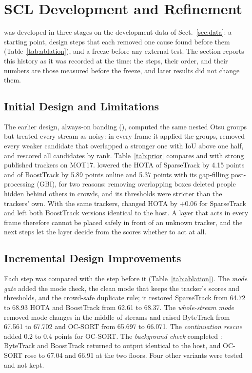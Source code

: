 \section{SCL Development and Refinement}\label{sec:development}

\scl{} was developed in three stages on the development data of Sect.~\ref{sec:data}: a starting
point, design steps that each removed one cause found before them (Table~\ref{tab:ablation}), and a
freeze before any external test. The section reports this history as it was recorded at the time:
the steps, their order, and their numbers are those measured before the freeze, and later results
did not change them.



\subsection{Initial Design and Limitations}\label{sec:prior}
The earlier design, always-on banding (\aob{}), computed the same nested Otsu groups but treated every stream as noisy:
in every frame it applied the groups, removed every weaker candidate that overlapped a stronger one
with IoU above one half, and rescored all candidates by rank. Table~\ref{tab:prior} compares \aob{}
and \scl{} with strong published trackers on MOT17. \aob{} lowered the HOTA of SparseTrack by 4.15
points and of BoostTrack by 5.89 points online and 5.37 points with its gap-filling post-processing
(GBI), for two reasons: removing overlapping boxes deleted people hidden behind others in crowds,
and its thresholds were stricter than the trackers' own. With the same trackers, \scl{} changed
HOTA by $+0.06$ for SparseTrack and left both BoostTrack versions identical to the host. A layer
that acts in every frame therefore cannot be placed safely in front of an unknown tracker, and the
next steps let the layer decide from the scores whether to act at all.


\subsection{Incremental Design Improvements}\label{sec:steps}
Each step was compared with the step before it (Table~\ref{tab:ablation}). The \emph{mode gate}
added the mode check, the clean mode that keeps the tracker's scores and thresholds, and the crowd-safe duplicate
rule; it restored SparseTrack from 64.72 to 68.93 HOTA and BoostTrack from 62.61 to 68.37. The
\emph{whole-stream mode} removed mode changes in the middle of streams and raised ByteTrack from
67.561 to 67.702 and OC-SORT from 65.697 to 66.071. The \emph{continuation rescue} added 0.2 to 0.4
points for OC-SORT. The \emph{background check} completed \scl{}: ByteTrack and BoostTrack returned
to output identical to the host, and OC-SORT rose to 67.04 and 66.91 at the two floors. Four other
variants were tested and not kept.



